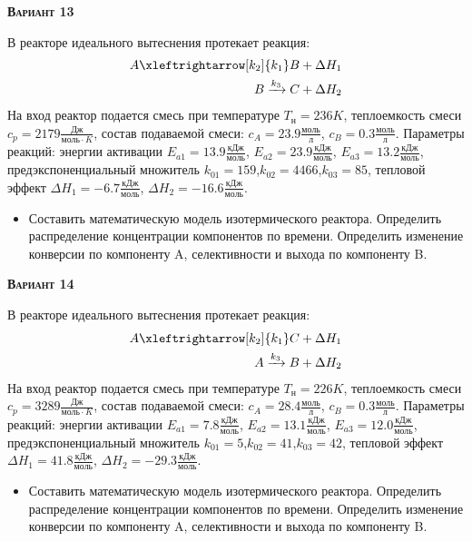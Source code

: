 \textsc{\textbf{Вариант 13}}

 В реакторе идеального вытеснения протекает реакция: \begin{equation*} \begin{aligned} A \xleftrightarrow[k_2]{k_1} B + \Delta H_1 \\ B \xrightarrow{k_3} C + \Delta H_2 \end{aligned} \end{equation*}                              На вход  реактор подается смесь при температуре $ T_{н} =  236 K$, теплоемкость смеси $c_p= 2179 \frac{Дж}{моль \cdot K}$, состав подаваемой смеси: $c_A=23.9 \frac{моль}{л}$, $c_B=0.3 \frac{моль}{л}$. Параметры реакций: энергии активации $E_{a1}=13.9 \frac{кДж}{моль}$, $E_{a2}=23.9  \frac{кДж}{моль}$, $E_{a3}=13.2  \frac{кДж}{моль}$, предэкспоненциальный множитель $k_{01}=       159$,$k_{02}=      4466$,$k_{03}=        85$, тепловой эффект $\Delta H_1= -6.7  \frac{кДж}{моль}$, $\Delta H_2=-16.6 \frac{кДж}{моль}$.\begin{itemize} \item Составить математическую модель изотермического реактора. Определить распределение концентрации компонентов по времени. Определить изменение конверсии по компоненту A, селективности и выхода по компоненту B. \end{itemize}

\textsc{\textbf{Вариант 14}}

 В реакторе идеального вытеснения протекает реакция: \begin{equation*} \begin{aligned} A \xleftrightarrow[k_2]{k_1} C + \Delta H_1 \\ A \xrightarrow{k_3} B + \Delta H_2 \end{aligned} \end{equation*}                              На вход  реактор подается смесь при температуре $ T_{н} =  226 K$, теплоемкость смеси $c_p= 3289 \frac{Дж}{моль \cdot K}$, состав подаваемой смеси: $c_A=28.4 \frac{моль}{л}$, $c_B=0.3 \frac{моль}{л}$. Параметры реакций: энергии активации $E_{a1}= 7.8 \frac{кДж}{моль}$, $E_{a2}=13.1  \frac{кДж}{моль}$, $E_{a3}=12.0  \frac{кДж}{моль}$, предэкспоненциальный множитель $k_{01}=         5$,$k_{02}=        41$,$k_{03}=        42$, тепловой эффект $\Delta H_1= 41.8  \frac{кДж}{моль}$, $\Delta H_2=-29.3 \frac{кДж}{моль}$.\begin{itemize} \item Составить математическую модель изотермического реактора. Определить распределение концентрации компонентов по времени. Определить изменение конверсии по компоненту A, селективности и выхода по компоненту B. \end{itemize}

